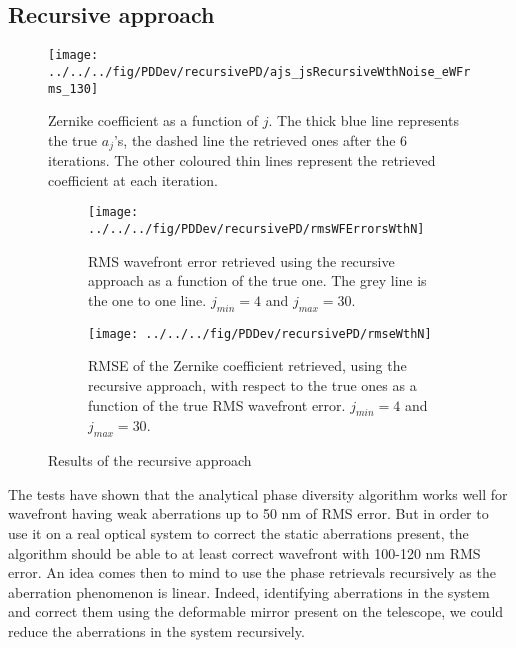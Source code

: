 \subsection{Recursive approach}
\label{subsec:RecApp}

\begin{figure}
\begin{center}
\texttt{[image: ../../../fig/PDDev/recursivePD/ajs\_jsRecursiveWthNoise\_eWFrms\_130]}
\decoRule
\caption{Zernike coefficient as a function of $j$. The thick blue line represents the true $a_j$'s, the dashed line the retrieved ones after the 6 iterations. The other coloured thin lines represent the retrieved coefficient at each iteration.}
\label{fig:ajs_jsRecursiveWthNoise_eWFrms_130}
\end{center}
\end{figure}

\begin{figure}
\centering
    \begin{subfigure}{0.45\textwidth}
        \texttt{[image: ../../../fig/PDDev/recursivePD/rmsWFErrorsWthN]}
        \caption{RMS wavefront error retrieved using the recursive approach as a function of the true one. The grey line is the one to one line. $j_{min}=4$ and $j_{max}=30$.}
        \label{subfig:rmsWFErrorsWthN}
    \end{subfigure}
    \quad
    \begin{subfigure}{0.45\textwidth}
        \texttt{[image: ../../../fig/PDDev/recursivePD/rmseWthN]}
        \caption{RMSE of the Zernike coefficient retrieved, using the recursive approach, with respect to the true ones as a function of the true RMS wavefront error.  $j_{min}=4$ and $j_{max}=30$.}
        \label{subfig:rmseWthN}
    \end{subfigure}
    \decoRule
    \caption{Results of the recursive approach}
\end{figure}

The tests have shown that the analytical phase diversity algorithm works well for wavefront having weak aberrations up to 50 nm of RMS error. But in order to use it on a real optical system to correct the static aberrations present, the algorithm should be able to at least correct wavefront with 100-120 nm RMS error. An idea comes then to mind to use the phase retrievals recursively as the aberration phenomenon is linear. Indeed, identifying aberrations in the system and correct them using the deformable mirror present on the telescope, we could reduce the aberrations in the system recursively.

